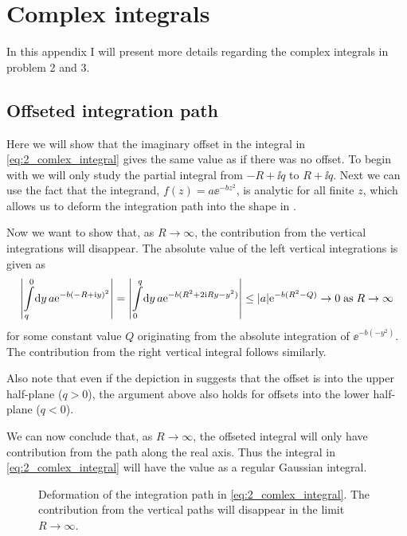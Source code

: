 \documentclass[11pt,letter, swedish, english
]{article}
\renewcommand{\thesubsection}{\arabic{section} (\alph{subsection})}
\begin{document}
\newpage
\appendix
\renewcommand{\thesubsection}{\Alph{section}.\arabic{subsection}}
\section{Complex integrals}
In this appendix I will present more details regarding the complex
integrals in problem 2 and 3. 

\subsection{Offseted integration path}\label{sec:offset}
Here we will show that the  imaginary offset in the integral in
\eqref{eq:2_comlex_integral} gives the same value as if there was no
offset. To begin with we will only study the partial integral from
$-R+\ii q$ to $R+\ii q$. Next we can use the fact that the
integrand, $f(z)=a\ee^{-bz^2}$, is analytic for all finite $z$, which
allows us to deform the integration path into the shape in
.

Now we want to show that, as $R\to\infty$, the contribution from the
vertical integrations will disappear. The absolute value of the
left vertical integrations is given as
\begin{equation}
\abs{\int_{q}^0\!\rd{y}\,a\ee^{-b(-R+\ii y)^2}}
=\abs{\int_{0}^q\!\rd{y}\,a\ee^{-b(R^2+2\ii Ry - y^2)}}
\le\abs{a}\ee^{-b(R^2-Q)}\to0\;\text{as}\;R\to\infty
\end{equation}
for some constant value $Q$ originating from the absolute integration
of $\ee^{-b(-y^2)}$. The contribution from the right vertical integral
follows similarly. 

Also note that even if the depiction in 
suggests that the offset is into the upper half-plane ($q>0$), the argument
above also holds for offsets into the lower half-plane ($q<0$).

We can now conclude that, as $R\to\infty$, the offseted integral will
only have contribution from the path along the real axis. Thus the
integral in \eqref{eq:2_comlex_integral} will have the value as a
regular Gaussian integral.

\begin{figure}\centering
\resizebox{.5\textwidth}{!}{}
\caption{Deformation of the integration path in
  \eqref{eq:2_comlex_integral}. The contribution from the vertical
  paths will disappear in the limit $R\to\infty$.}
\label{fig:int_path_2}
\end{figure}
\end{document}
